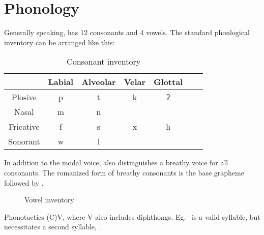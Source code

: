 \chapter{Phonology}

Generally speaking, \langname{} has 12 consonants and 4 vowels. The standard phonlogical inventory can be arranged like this:

\begin{table}[ht]


  \centering
  \begin{tabular}{*{7}{c}}
    \toprule
              & Labial & Alveolar & Velar & Glottal \\\midrule
    Plosive   & p      & t        & k     & ʔ \orthotext{'}      \\
    Nasal     & m      & n        &       &         \\
    Fricative & f      & s        & x     & h       \\
    Sonorant  & w      & l        &       &         \\
    \bottomrule
  \end{tabular}
  \caption{Consonant inventory}
\end{table}

In addition to the modal voice, \langname{} also distinguishes a breathy voice for all consonants. The romanized form of breathy consonants is the base grapheme followed by .

\begin{figure}[htbp]
  \centering
  \begin{vowel}
  \end{vowel}
  \caption{Vowel inventory}
\end{figure}

Phonotactics (C)V, where V also includes diphthongs. Eg.\  is a valid syllable, but  necessitates a second syllable, .